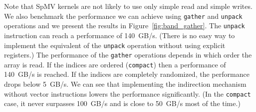 \documentclass[10pt,conference,compsocconf]{IEEEtran}
\begin{document}
Note that SpMV kernels are not likely to use only simple read and simple
writes. We also benchmark the performance we
can achieve using {\tt gather} and {\tt unpack} operations and we
present the results in Figure~\ref{fig:band_gather}. The {\tt unpack}
instruction can reach a performance of 140~GB/s. (There is no easy way
to implement the equivalent of the {\tt unpack} operation without
using explicit registers.) The performance of the {\tt gather}
operations depends in which order the array is read. If the indices
are ordered ({\tt compact}) then a performance of 140~GB/s is
reached. If the indices are completely randomized, the performance
drops below 5~GB/s. We can see that implementing the
indirection mechanism without vector instructions lowers the
performance significantly. (In the {\tt compact} case, it never
surpasses 100~GB/s and is close to 50~GB/s most of the time.)
\def\ww{.19\textwidth}
\end{document}
